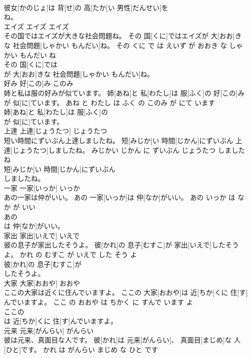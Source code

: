 \documentclass[8pt]{extreport}
\begin{document}
\begin{CJK}{UTF8}{min}
\\	彼女[かのじょ]は 背[せ]の 高[たか]い 男性[だんせい]を
\\	ね。			
\\	エイズ	エイズ	エイズ	
\\	その国ではエイズが大きな社会問題ね。	その 国[くに]ではエイズが 大[おお]きな 社会問題[しゃかい もんだい]ね。	その くに で は えいず が おおき な しゃかい もんだい ね	
\\	その 国[くに]では
\\	が 大[おお]きな 社会問題[しゃかい もんだい]ね。			
\\	好み	好[この]み	このみ	
\\	姉と私は服の好みが似ています。	姉[あね]と 私[わたし]は 服[ふく]の 好[この]みが 似[に]ています。	あね と わたし は ふく の このみ が にて います	
\\	姉[あね]と 私[わたし]は 服[ふく]の
\\	が 似[に]ています。			
\\	上達	上達[じょうたつ]	じょうたつ	
\\	短い時間にずいぶん上達しましたね。	短[みじか]い 時間[じかん]にずいぶん 上達[じょうたつ]しましたね。	みじかい じかん に ずいぶん じょうたつ しました ね	
\\	短[みじか]い 時間[じかん]にずいぶん
\\	しましたね。			
\\	一家	一家[いっか]	いっか	
\\	あの一家は仲がいい。	あの 一家[いっか]は 仲[なか]がいい。	あの いっか は なか が いい	
\\	あの
\\	は 仲[なか]がいい。			
\\	家出	家出[いえで]	いえで	
\\	彼の息子が家出したそうよ。	彼[かれ]の 息子[むすこ]が 家出[いえで]したそうよ。	かれ の むすこ が いえで した そう よ	
\\	彼[かれ]の 息子[むすこ]が
\\	したそうよ。			
\\	大家	大家[おおや]	おおや	
\\	ここの大家は近くに住んでいますよ。	ここの 大家[おおや]は 近[ちか]くに 住[す]んでいますよ。	ここ の おおや は ちかく に すんで います よ	
\\	ここの
\\	は 近[ちか]くに 住[す]んでいますよ。			
\\	元来	元来[がんらい]	がんらい	
\\	彼は元来、真面目な人です。	彼[かれ]は 元来[がんらい]、 真面目[まじめ]な 人[ひと]です。	かれ は がんらい まじめ な ひと です	

\end{CJK}
\end{document}
